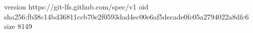 version https://git-lfs.github.com/spec/v1
oid sha256:fb38c14bd36811ccb70e2f0593dad4ec00e6af5decade0fc05a2794022a8dfc6
size 8149
